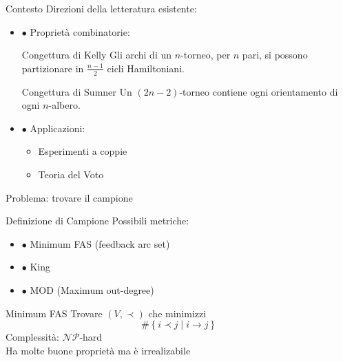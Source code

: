 \documentclass{beamer}
\begin{document}
\begin{frame}{Contesto}
	Direzioni della letteratura esistente:
	\vspace{3mm}
		\begin{itemize}
			\item  $\bullet$ Proprietà combinatorie:
			\begin{center}
				\begin{minipage}{.7 \textwidth}
					\begin{block}{Congettura di Kelly}
						Gli archi di un $n$-torneo, per $n$ pari, si possono partizionare in $\frac{n-1}{2}$ cicli Hamiltoniani.
					\end{block}
				\end{minipage}
			\end{center}
			\begin{center}
				\begin{minipage}{.7 \textwidth}
					\begin{block}{Congettura di Sumner}
						Un $(2n-2)$-torneo contiene ogni orientamento di ogni $n$-albero.
					\end{block}
				\end{minipage}
			\end{center}

		\pause
			\item $\bullet$ Applicazioni:
			\begin{itemize}
				\vspace{3mm}
				\item Esperimenti a coppie
				\vspace{3mm}
				\item Teoria del Voto
			\end{itemize}

	\end{itemize}
\end{frame}

\begin{frame}{Problema: trovare il campione}
	\begin{block}{Definizione di Campione}
		Possibili metriche:
		\begin{itemize}
			\item $\bullet$ Minimum FAS (feedback arc set)
			\item $\bullet$ King
			\item $\bullet$ MOD (Maximum out-degree)
		\end{itemize}
	\end{block}
	\pause
	\begin{block}{Minimum FAS}
		Trovare $\left(V, \prec\right)$ che minimizzi
		$$ \# \left\{i \prec j \; | \; i \longrightarrow j \right\} $$
		Complessità: $\mathcal{NP}$-hard \\
		\vspace{3mm}
		Ha molte buone proprietà ma è irrealizabile
	\end{block}
\end{frame}
\end{document}
